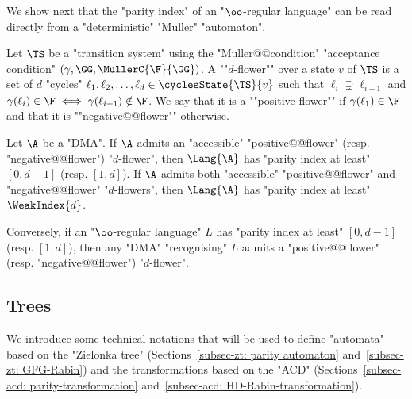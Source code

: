 \documentclass[10pt,a4paper]{amsart}
\renewcommand{\gg}{\gamma}
\begin{document}
We show next that the "parity index" of an "$\oo$-regular language" can be read directly from a "deterministic" "Muller" "automaton". 
	
Let $\TS$ be a "transition system" using the "Muller@@condition" "acceptance condition" $(\gg, \GG, \MullerC{\F}{\GG})$. 
\AP A ""$d$-flower"" over a state $v$ of $\TS$ is a set of $d$ "cycles" $\ell_1, \ell_2, \dots, \ell_{d}\in \cyclesState{\TS}{v}$ such that $\ell_i \supsetneq \ell_{i+1}$ and $\gg(\ell_i)\in \F \iff \gg(\ell_{i+1})\notin \F$. We say that it is a ""positive flower""  if $\gg(\ell_{1})\in \F$ and that it is ""negative@@flower"" otherwise.

\begin{lemma}\label{lemma:flower-lemma}
	Let $\A$ be a "DMA". If $\A$ admits an "accessible" "positive@@flower" (resp. "negative@@flower") "$d$-flower", then $\Lang{\A}$ has "parity index at least" $[0,d-1]$ (resp. $[1,d]$). If $\A$ admits both "accessible" "positive@@flower" and "negative@@flower" "$d$-flowers", then $\Lang{\A}$ has "parity index at least" $\WeakIndex{d}$.
	
	Conversely, if an "$\oo$-regular language" $L$ has "parity index at least" $[0,d-1]$ (resp. $[1,d]$), then any "DMA" "recognising" $L$ admits a "positive@@flower" (resp. "negative@@flower") "$d$-flower".
\end{lemma}


\subsection{Trees}\label{subsect-prelim:trees}
We introduce some technical notations that will be used to define "automata" based on the "Zielonka tree" (Sections~\ref{subsec-zt: parity automaton} and~\ref{subsec-zt: GFG-Rabin}) and the transformations based on the "ACD" (Sections~\ref{subsec-acd: parity-transformation} and~\ref{subsec-acd: HD-Rabin-transformation}).
\end{document}
